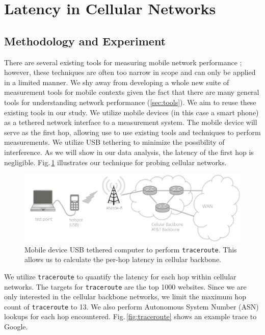 \section{Latency in Cellular Networks}
\label{sec:latency-in-cellular}

\subsection{Methodology and Experiment}
\label{sec:methodology}

There are several existing tools for measuring mobile network performance \cite{speedtest, huang2011mobiperf}; however, these techniques are often too narrow in scope and can only be applied in a limited manner. We shy away from developing a whole new suite of measurement tools for mobile contexts given the fact that there are many general tools for understanding network performance (\ref{sec:tools}). We aim to reuse these existing tools in our study. We utilize mobile devices (in this case a smart phone) as a tethered network interface to a measurement system. The mobile device will serve as the first hop, allowing use to use existing tools and techniques to perform measurements. We utilize USB tethering to minimize the possibility of interference. As we will show in our data analysis, the latency of the first hop is negligible. Fig.\,\ref{fig:mobile_networks_method} illustrates our technique for probing cellular networks.

\begin{figure}[!tbh]
  \centering
  \includegraphics[width=\linewidth]{../figs/mobile_networks_method.pdf}
  \vspace{-1em}
  \caption{Mobile device USB tethered computer to perform \texttt{traceroute}. This allows us to calculate the per-hop latency in cellular backbone.}
  \label{fig:mobile_networks_method}
\end{figure}

We utilize \texttt{traceroute} to quantify the latency for each hop within cellular networks. The targets for \texttt{traceroute} are the top 1000 websites. Since we are only interested in the cellular backbone networks, we limit the maximum hop count of \texttt{traceroute} to 13. We also perform Autonomous System Number (ASN) lookups for each hop encountered. Fig.\,\ref{fig:traceroute} shows an example trace to Google.

